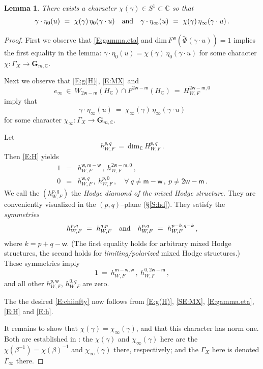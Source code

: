 \documentclass[12pt]{amsart}
\numberwithin{equation}{section}
\numberwithin{table}{section}
\def\b{\beta}
\def\bC{\mathbb{C}}
\def\tdim{\mathrm{dim}}
\def\bfG{\mathbf{G}}
\def\sfm{\mathsf{m}}
\def\sfw{\mathsf{w}}
\def\tand{\quad\hbox{and}\quad}
\newtheorem{lemma}[equation]{Lemma}
\theoremstyle{definition}
\theoremstyle{definition}
\theoremstyle{remark}
\def\tPhi{\tilde\Phi}
\begin{document}
\begin{lemma} \label{L:char}
There exists a character $\chi(\gamma) \in S^1 \subset \bC$ so that
\[
  \gamma \cdot \eta_0(u) \ = \ \chi(\gamma)\,\eta_0(\gamma \cdot u)
  \tand 
  \gamma \cdot \eta_\infty(u) \ = \ 
  \chi(\gamma)\,\eta_\infty(\gamma \cdot u) \,.
\] 
\end{lemma}

\begin{proof}
First we observe that \eqref{E:gamma.eta} and $\tdim\,F^\sfw(\tPhi(\gamma \cdot u)) = 1$ implies the first equality in the lemma: $\gamma \cdot \eta_0(u) = \chi(\gamma)\,\eta_0(\gamma \cdot u)$ for some character $\chi : \Gamma_X \to \bfG_{m,\bC}$.

Next we observe that \eqref{E:g(H)}, \eqref{E:MX} and 
\[
  e_\infty \ \in \ W_{2\sfw-\sfm}(H_\bC) \cap F^{2\sfw-\sfm}(H_\bC)
  \ = \ H^{2\sfw-\sfm,0}_{W,F}
\] 
imply that 
\begin{equation}\label{E:chiinfty}
  \gamma \cdot \eta_\infty(u) \ = \ 
  \chi_\infty(\gamma)\,\eta_\infty(\gamma \cdot u)
\end{equation}
for some character $\chi_\infty : \Gamma_X \to \bfG_{m,\bC}$.  

Let 
\[
  h^{p,q}_{W,F} \ = \ \tdim_\bC\, H^{p,q}_{W,F} \,.
\]
Then \eqref{E:H} yields
\begin{equation}\label{E:h}
\begin{array}{rcl}
  1 & = & h^{\sfw,\sfm-\sfw}_{W,F} \,,\
  h^{2\sfw-\sfm,0}_{W,F} \,,\\
  0 & = & h^{\sfw,q}_{W,F} \,,\ h^{p,0}_{W,F} \,,
  \quad \forall \ q\not=\sfm-\sfw \,,\ p \not=2\sfw-\sfm \,.
\end{array}
\end{equation}
We call the $(h^{p,q}_{W,F})$ the \emph{Hodge diamond of the mixed Hodge structure}.  They are conveniently visualized in the $(p,q)$--plane (\S\ref{S:hd}).  They satisfy the \emph{symmetries}
\begin{equation}\label{E:symmetries}
  h^{p,q}_{W,F} \ = \ h^{q,p}_{W,F}
  \tand
  h^{p,q}_{W,F} \ = \ h^{p-k,q-k}_{W,F} \,,
\end{equation}
where $k = p+q-\sfw$.  (The first equality holds for arbitrary mixed Hodge structures, the second holds for \emph{limiting/polarized} mixed Hodge structures.)  These symmetries imply
\[
  1 \ = \ h^{\sfm-\sfw,\sfw}_{W,F} \,,\ 
  h^{0,2\sfw-\sfm}_{W,F}  \,,
\]
and all other $h^{p,\sfw}_{W,F}$, $h^{0,q}_{W,F}$ are zero. 

The the desired \eqref{E:chiinfty} now follows from \eqref{E:g(H)}, \eqref{SE:MX}, \eqref{E:gamma.eta}, \eqref{E:H} and \eqref{E:h}.

It remains to show that $\chi(\gamma) = \chi_\infty(\gamma)$, and that this character has norm one.  Both are established in \cite[Lemma 5.10 and Theorem 5.21]{GGR-part1}: the $\chi(\gamma)$ and $\chi_\infty(\gamma)$ here are the $\chi(\b^{-1}) = \chi(\b)^{-1}$ and $\chi_\infty(\gamma)$ there, respectively; and the $\Gamma_X$ here is denoted $\Gamma_\infty$ there.
\end{proof}
\end{document}
